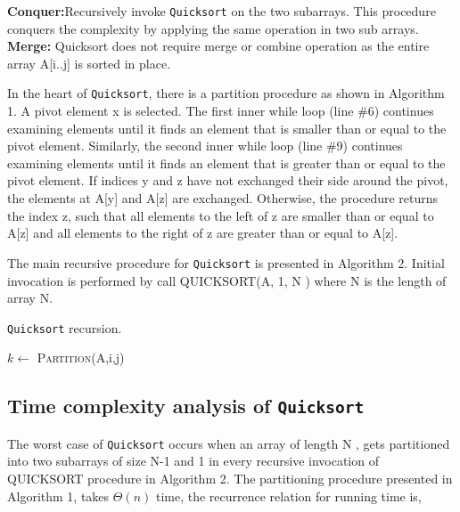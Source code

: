 \documentclass[a4paper, 10pt,twocolumn]{article}
\begin{document}
\textbf{Conquer:}Recursively invoke \texttt{Quicksort} on the two subarrays. This procedure conquers the complexity by applying the same operation in two sub arrays.\newline
\textbf{Merge:} Quicksort does not require merge or combine operation as the entire array A[i..j] is sorted in place.\par
In the heart of \texttt{Quicksort}, there is a partition procedure as shown in Algorithm 1. A pivot element x is selected. The first inner while loop (line \#6) continues examining elements until it finds an element that is smaller than or equal to the pivot element. Similarly, the second inner while loop (line
\#9) continues examining elements until it finds an element that is greater than or equal to the pivot element. If indices y and z have not exchanged their side around the pivot, the elements at A[y] and A[z] are exchanged. Otherwise, the procedure returns the index z, such that all elements to the left of z are smaller than or equal to A[z] and all
elements to the right of z are greater than or equal to A[z].\par
The main recursive procedure for \texttt{Quicksort} is presented in Algorithm 2. Initial invocation is performed by call QUICKSORT(A, 1, N ) where N is
the length of array N.

\begin{algorithm}
  \caption{\texttt{Quicksort} recursion.}
  \label{algo:ins_sort1}
  \begin{algorithmic}[1]
     \newline
        \State $k \leftarrow $ \textsc{Partition}(A,i,j)
        \State {} 
        \State {}
      \EndIf
     \EndProcedure 
  \end{algorithmic}
\end{algorithm}


\subsection{Time complexity analysis of \texttt{Quicksort}}
The worst case of \texttt{Quicksort} occurs when an array of length N , gets partitioned into two subarrays
of size N-1 and 1 in every recursive invocation of
QUICKSORT procedure in Algorithm 2. The partitioning procedure presented in Algorithm 1, takes $\Theta(n)$ time, the recurrence relation for running time
is,
\end{document}
